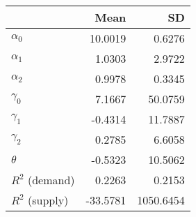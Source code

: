 
\begin{tabular}[t]{lrr}
\toprule
  & Mean & SD\\
\midrule
$\alpha_{0}$ & 10.0019 & 0.6276\\
$\alpha_{1}$ & 1.0303 & 2.9722\\
$\alpha_{2}$ & 0.9978 & 0.3345\\
$\gamma_{0}$ & 7.1667 & 50.0759\\
$\gamma_{1}$ & -0.4314 & 11.7887\\
$\gamma_{2}$ & 0.2785 & 6.6058\\
$\theta$ & -0.5323 & 10.5062\\
$R^{2}$ (demand) & 0.2263 & 0.2153\\
$R^{2}$ (supply) & -33.5781 & 1050.6454\\
\bottomrule
\end{tabular}
